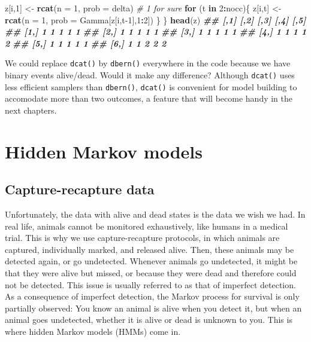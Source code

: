\documentclass[
  12pt,
]{krantz}
\newenvironment{Shaded}{\begin{snugshade}}{\end{snugshade}}
\newcommand{\AttributeTok}[1]{\textcolor[rgb]{0.13,0.29,0.53}{#1}}
\newcommand{\CommentTok}[1]{\textcolor[rgb]{0.56,0.35,0.01}{\textit{#1}}}
\newcommand{\ControlFlowTok}[1]{\textcolor[rgb]{0.13,0.29,0.53}{\textbf{#1}}}
\newcommand{\DecValTok}[1]{\textcolor[rgb]{0.00,0.00,0.81}{#1}}
\newcommand{\DocumentationTok}[1]{\textcolor[rgb]{0.56,0.35,0.01}{\textbf{\textit{#1}}}}
\newcommand{\FunctionTok}[1]{\textcolor[rgb]{0.13,0.29,0.53}{\textbf{#1}}}
\newcommand{\NormalTok}[1]{#1}
\newcommand{\OtherTok}[1]{\textcolor[rgb]{0.56,0.35,0.01}{#1}}
\newcommand{\SpecialCharTok}[1]{\textcolor[rgb]{0.81,0.36,0.00}{\textbf{#1}}}
\begin{document}
\begin{Shaded}
\begin{Highlighting}[]
\NormalTok{  z[i,}\DecValTok{1}\NormalTok{] }\OtherTok{\textless{}{-}} \FunctionTok{rcat}\NormalTok{(}\AttributeTok{n =} \DecValTok{1}\NormalTok{, }\AttributeTok{prob =}\NormalTok{ delta) }\CommentTok{\# 1 for sure}
  \ControlFlowTok{for}\NormalTok{ (t }\ControlFlowTok{in} \DecValTok{2}\SpecialCharTok{:}\NormalTok{nocc)\{}
\NormalTok{    z[i,t] }\OtherTok{\textless{}{-}} \FunctionTok{rcat}\NormalTok{(}\AttributeTok{n =} \DecValTok{1}\NormalTok{, }\AttributeTok{prob =}\NormalTok{ Gamma[z[i,t}\DecValTok{{-}1}\NormalTok{],}\DecValTok{1}\SpecialCharTok{:}\DecValTok{2}\NormalTok{]) }
\NormalTok{  \}}
\NormalTok{\}}
\FunctionTok{head}\NormalTok{(z) }
\DocumentationTok{\#\#      [,1] [,2] [,3] [,4] [,5]}
\DocumentationTok{\#\# [1,]    1    1    1    1    1}
\DocumentationTok{\#\# [2,]    1    1    1    1    1}
\DocumentationTok{\#\# [3,]    1    1    1    1    1}
\DocumentationTok{\#\# [4,]    1    1    1    1    2}
\DocumentationTok{\#\# [5,]    1    1    1    1    1}
\DocumentationTok{\#\# [6,]    1    1    2    2    2}
\end{Highlighting}
\end{Shaded}

We could replace \texttt{dcat()} by \texttt{dbern()} everywhere in the code because we have binary events alive/dead. Would it make any difference? Although \texttt{dcat()} uses less efficient samplers than \texttt{dbern()}, \texttt{dcat()} is convenient for model building to accomodate more than two outcomes, a feature that will become handy in the next chapters.

\section{Hidden Markov models}\label{hidden-markov-models}

\subsection{Capture-recapture data}\label{capturerecapturedata}

\begin{blackbox}
Unfortunately, the data with alive and dead states is the data we wish we had. In real life, animals cannot be monitored exhaustively, like humans in a medical trial. This is why we use capture-recapture protocols, in which animals are captured, individually marked, and released alive. Then, these animals may be detected again, or go undetected. Whenever animals go undetected, it might be that they were alive but missed, or because they were dead and therefore could not be detected. This issue is usually referred to as that of imperfect detection. As a consequence of imperfect detection, the Markov process for survival is only partially observed: You know an animal is alive when you detect it, but when an animal goes undetected, whether it is alive or dead is unknown to you. This is where hidden Markov models (HMMs) come in.

\end{blackbox}
\end{document}
